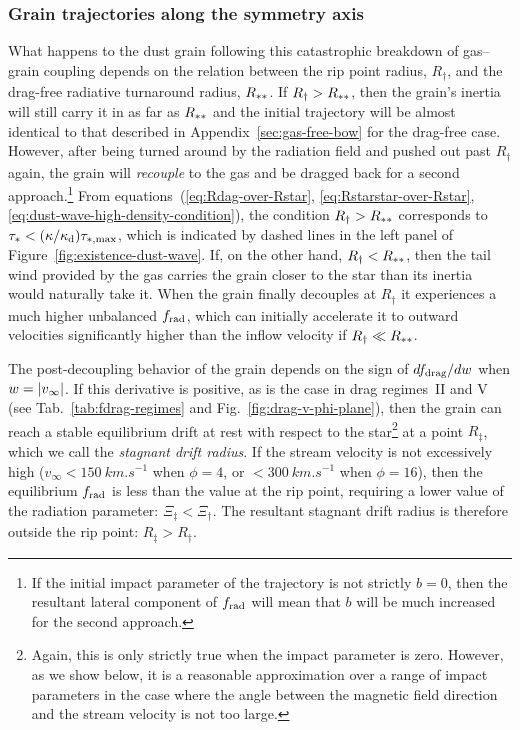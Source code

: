 \subsubsection{Grain trajectories along the symmetry axis}
\label{sec:grain-traj-along}

What happens to the dust grain following this catastrophic breakdown
of gas--grain coupling depends on the relation between the rip point
radius, \(R_\dag\), and the drag-free radiative turnaround radius,
\(R_{**}\).  If \(R_\dag > R_{**}\), then the grain's inertia
will still carry it in as far as \(R_{**}\) and the initial
trajectory will be almost identical to that described in
Appendix~\ref{sec:gas-free-bow} for the drag-free case. However, after
being turned around by the radiation field and pushed out past
\(R_\dag\) again, the grain will \emph{recouple} to the gas and be
dragged back for a second approach.\footnote{If the initial impact
  parameter of the trajectory is not strictly \(b = 0\), then the
  resultant lateral component of \(f_{\text{rad}}\) will mean that \(b\) will
  be much increased for the second approach.} %
From equations~(\ref{eq:Rdag-over-Rstar},
\ref{eq:Rstarstar-over-Rstar},
\ref{eq:dust-wave-high-density-condition}), the condition
\(R_\dag > R_{**}\) corresponds to
\(\tau_* < (\kappa/\kappa_{\text{d}}) \tau_{*,\text{max}}\), which is indicated by dashed
lines in the left panel of Figure~\ref{fig:existence-dust-wave}.  If,
on the other hand, \(R_\dag < R_{**}\), then the tail wind provided
by the gas carries the grain closer to the star than its inertia would
naturally take it.  When the grain finally decouples at \(R_\dag\) it
experiences a much higher unbalanced \(f_{\text{rad}}\), which can initially
accelerate it to outward velocities significantly higher than the
inflow velocity if \(R_\dag \ll R_{**}\).


The post-decoupling behavior of the grain depends on the sign of
\(d f_{\text{drag}} / d w\) when \(w = \lvert v_\infty\rvert\).  If this derivative is
positive, as is the case in drag regimes~II and V (see
Tab.~\ref{tab:fdrag-regimes} and Fig.~\ref{fig:drag-v-phi-plane}),
then the grain can reach a stable equilibrium drift at rest with
respect to the star\footnote{%
  Again, this is only strictly true when the impact parameter is zero.
  However, as we show below, it is a reasonable approximation over a
  range of impact parameters in the case where the angle between the
  magnetic field direction and the stream velocity is not too
  large.} %
at a point \(R_\ddag\), which we call the \textit{stagnant drift
  radius}. If the stream velocity is not excessively high
(\(v_\infty < \SI{150}{km.s^{-1}}\) when \(\phi = 4\), or
\(< \SI{300}{km.s^{-1}}\) when \(\phi = 16\)), then the equilibrium
\(f_{\text{rad}}\) is less than the value at the rip point, requiring a lower
value of the radiation parameter: \(\Xi_\ddag < \Xi_\dag\).  The resultant
stagnant drift radius is therefore outside the rip point:
\(R_\ddag > R_\dag\).

